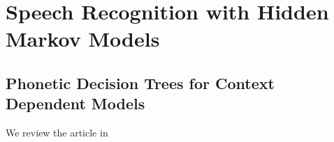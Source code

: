 \chapter{Speech Recognition with Hidden Markov Models}

\section{Phonetic Decision Trees for Context Dependent Models}
We review the article in \cite{young1994state}


